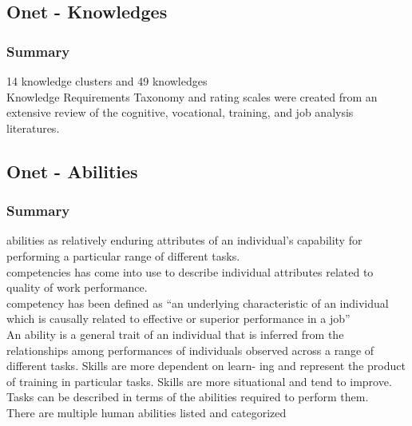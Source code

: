 \documentclass[12pt]{article}
\begin{document}
\subsection*{Onet - Knowledges\cite{onet}}

\subsubsection*{Summary}

14 knowledge clusters and 49 knowledges \\

Knowledge Requirements Taxonomy and rating scales were created from an extensive review of the cognitive, vocational, training, and job analysis literatures.

\subsection*{Onet - Abilities\cite{onet}}

\subsubsection*{Summary}

abilities as relatively enduring attributes of an individual's capability for performing a particular range of different tasks.\\

competencies has come into use to describe individual attributes related to quality of work performance.\\

competency has been defined as “an underlying characteristic of an individual which is causally related to effective or superior performance in a job”\\

An ability is a general trait of an individual that is inferred from the relationships among performances of individuals observed across a range of different tasks. Skills are more dependent on learn- ing and represent the product of training in particular tasks. Skills are more situational and tend to improve. \\

Tasks can be described in terms of the abilities required to perform them.\\

There are multiple human abilities listed and categorized\\



\end{document}
